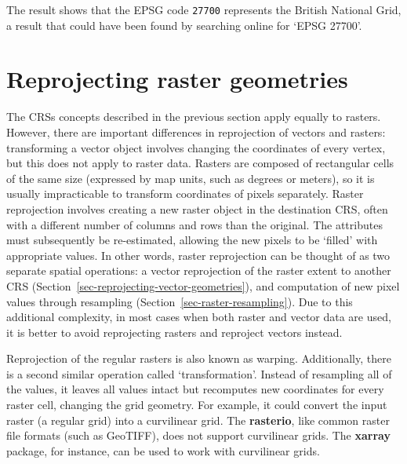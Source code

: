 \documentclass[
  letterpaper,
]{krantz}
\begin{document}
The result shows that the EPSG code \texttt{27700} represents the
British National Grid, a result that could have been found by searching
online for `EPSG 27700'.

\section{Reprojecting raster
geometries}\label{sec-reprojecting-raster-geometries}

The CRSs concepts described in the previous section apply equally to
rasters. However, there are important differences in reprojection of
vectors and rasters: transforming a vector object involves changing the
coordinates of every vertex, but this does not apply to raster data.
Rasters are composed of rectangular cells of the same size (expressed by
map units, such as degrees or meters), so it is usually impracticable to
transform coordinates of pixels separately. Raster reprojection involves
creating a new raster object in the destination CRS, often with a
different number of columns and rows than the original. The attributes
must subsequently be re-estimated, allowing the new pixels to be
`filled' with appropriate values. In other words, raster reprojection
can be thought of as two separate spatial operations: a vector
reprojection of the raster extent to another CRS
(Section~\ref{sec-reprojecting-vector-geometries}), and computation of
new pixel values through resampling
(Section~\ref{sec-raster-resampling}). Due to this additional
complexity, in most cases when both raster and vector data are used, it
is better to avoid reprojecting rasters and reproject vectors instead.

\begin{tcolorbox}[enhanced jigsaw, colframe=quarto-callout-note-color-frame, arc=.35mm, leftrule=.75mm, bottomrule=.15mm, coltitle=black, colbacktitle=quarto-callout-note-color!10!white, title=\textcolor{quarto-callout-note-color}{\faInfo}\hspace{0.5em}{Note}, opacityback=0, toptitle=1mm, bottomtitle=1mm, colback=white, opacitybacktitle=0.6, titlerule=0mm, rightrule=.15mm, toprule=.15mm, breakable, left=2mm]

Reprojection of the regular rasters is also known as warping.
Additionally, there is a second similar operation called
`transformation'. Instead of resampling all of the values, it leaves all
values intact but recomputes new coordinates for every raster cell,
changing the grid geometry. For example, it could convert the input
raster (a regular grid) into a curvilinear grid. The \textbf{rasterio},
like common raster file formats (such as GeoTIFF), does not support
curvilinear grids. The \textbf{xarray} package, for instance, can be
used to work with curvilinear grids.

\end{tcolorbox}
\end{document}
